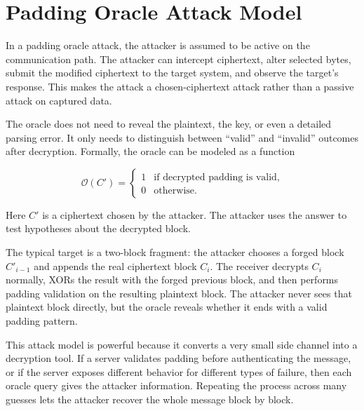 \section{Padding Oracle Attack Model}

In a padding oracle attack, the attacker is assumed to be active on the communication path. The attacker can intercept ciphertext, alter selected bytes, submit the modified ciphertext to the target system, and observe the target's response. This makes the attack a chosen-ciphertext attack rather than a passive attack on captured data.

The oracle does not need to reveal the plaintext, the key, or even a detailed parsing error. It only needs to distinguish between ``valid'' and ``invalid'' outcomes after decryption. Formally, the oracle can be modeled as a function

\[
\mathcal{O}(C') =
\begin{cases}
1 & \text{if decrypted padding is valid,} \\
0 & \text{otherwise.}
\end{cases}
\]

Here $C'$ is a ciphertext chosen by the attacker. The attacker uses the answer to test hypotheses about the decrypted block.

The typical target is a two-block fragment: the attacker chooses a forged block $C'_{i-1}$ and appends the real ciphertext block $C_i$. The receiver decrypts $C_i$ normally, XORs the result with the forged previous block, and then performs padding validation on the resulting plaintext block. The attacker never sees that plaintext block directly, but the oracle reveals whether it ends with a valid padding pattern.

This attack model is powerful because it converts a very small side channel into a decryption tool. If a server validates padding before authenticating the message, or if the server exposes different behavior for different types of failure, then each oracle query gives the attacker information. Repeating the process across many guesses lets the attacker recover the whole message block by block.
